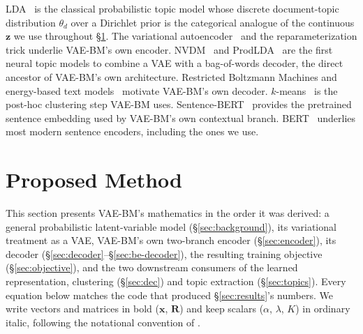 \documentclass[11pt]{article}
\begin{document}
LDA~\citep{blei2003lda} is the classical probabilistic topic model whose discrete document-topic distribution $\theta_d$ over a Dirichlet prior is the categorical analogue of the continuous $\mathbf{z}$ we use throughout \S\ref{sec:method}. The variational autoencoder~\citep{kingma2014autoencoding} and the reparameterization trick underlie VAE-BM's own encoder. NVDM~\citep{miao2016nvdm} and ProdLDA~\citep{srivastava2017prodlda} are the first neural topic models to combine a VAE with a bag-of-words decoder, the direct ancestor of VAE-BM's own architecture. Restricted Boltzmann Machines and energy-based text models~\citep{dahl2012rbm} motivate VAE-BM's own decoder. $k$-means~\citep{macqueen1967kmeans} is the post-hoc clustering step VAE-BM uses. Sentence-BERT~\citep{reimers2019sbert} provides the pretrained sentence embedding used by VAE-BM's own contextual branch. BERT~\citep{devlin2019bert} underlies most modern sentence encoders, including the ones we use.

\section{Proposed Method}
\label{sec:method}

This section presents VAE-BM's mathematics in the order it was derived: a general probabilistic latent-variable model (\S\ref{sec:background}), its variational treatment as a VAE, VAE-BM's own two-branch encoder (\S\ref{sec:encoder}), its decoder (\S\ref{sec:decoder}--\S\ref{sec:be-decoder}), the resulting training objective (\S\ref{sec:objective}), and the two downstream consumers of the learned representation, clustering (\S\ref{sec:dec}) and topic extraction (\S\ref{sec:topics}). Every equation below matches the code that produced \S\ref{sec:results}'s numbers. We write vectors and matrices in bold ($\mathbf{x}$, $\mathbf{R}$) and keep scalars ($\alpha$, $\lambda$, $K$) in ordinary italic, following the notational convention of \citet{kim2018tutorial}.
\end{document}
